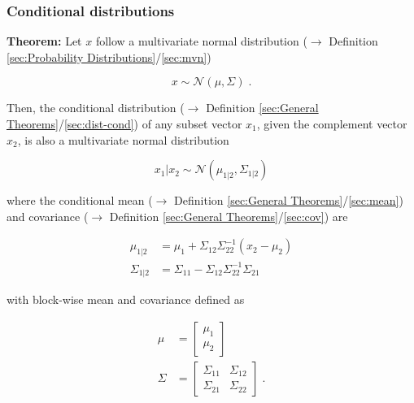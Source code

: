 \documentclass[a4paper,12pt,twoside]{book}
\begin{document}
\subsubsection[\textbf{Conditional distributions}]{Conditional distributions} \label{sec:mvn-cond}
\setcounter{equation}{0}

\textbf{Theorem:} Let $x$ follow a multivariate normal distribution ($\rightarrow$ Definition \ref{sec:Probability Distributions}/\ref{sec:mvn})

\begin{equation} \label{eq:mvn-cond-mvn}
x \sim \mathcal{N}(\mu, \Sigma) \; .
\end{equation}

Then, the conditional distribution ($\rightarrow$ Definition \ref{sec:General Theorems}/\ref{sec:dist-cond}) of any subset vector $x_1$, given the complement vector $x_2$, is also a multivariate normal distribution

\begin{equation} \label{eq:mvn-cond-mvn-cond}
x_1|x_2 \sim \mathcal{N}(\mu_{1|2}, \Sigma_{1|2})
\end{equation}

where the conditional mean ($\rightarrow$ Definition \ref{sec:General Theorems}/\ref{sec:mean}) and covariance ($\rightarrow$ Definition \ref{sec:General Theorems}/\ref{sec:cov}) are

\begin{equation} \label{eq:mvn-cond-mvn-cond-hyp}
\begin{split}
\mu_{1|2} &= \mu_1 + \Sigma_{12} \Sigma_{22}^{-1} (x_2 - \mu_2) \\
\Sigma_{1|2} &= \Sigma_{11} - \Sigma_{12} \Sigma_{22}^{-1} \Sigma_{21}
\end{split}
\end{equation}

with block-wise mean and covariance defined as

\begin{equation} \label{eq:mvn-cond-mvn-joint-hyp}
\begin{split}
\mu &= \begin{bmatrix} \mu_1 \\ \mu_2 \end{bmatrix} \\
\Sigma &= \begin{bmatrix} \Sigma_{11} & \Sigma_{12} \\ \Sigma_{21} & \Sigma_{22} \end{bmatrix} \; .
\end{split}
\end{equation}
\end{document}
